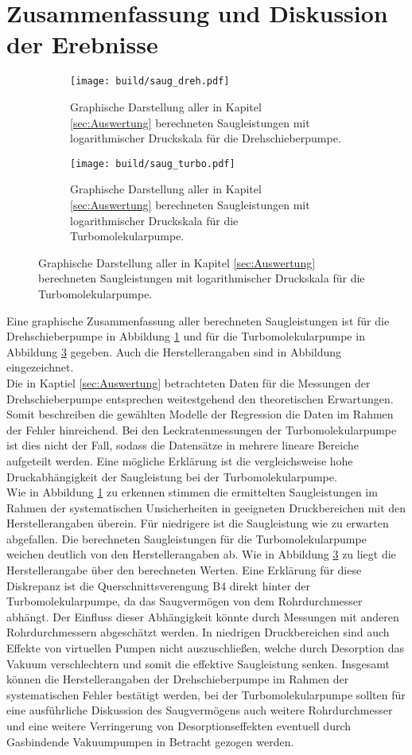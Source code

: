 \section{Zusammenfassung und Diskussion der Erebnisse}
\label{sec:Diskussion}
\begin{figure}[ht]
    \begin{subfigure}{0.8\textwidth}
            \centering
            \texttt{[image: build/saug\_dreh.pdf]}
            \caption{Graphische Darstellung aller in Kapitel \ref{sec:Auswertung} berechneten Saugleistungen mit logarithmischer Druckskala für die Drehschieberpumpe.}
            \label{fig:saug_dreh}
    \end{subfigure}
    \hfill
    \begin{subfigure}{0.8\textwidth}
            \centering
            \texttt{[image: build/saug\_turbo.pdf]}
            \caption{Graphische Darstellung aller in Kapitel \ref{sec:Auswertung} berechneten Saugleistungen mit logarithmischer Druckskala für die Turbomolekularpumpe.}
            \label{fig:saug_turbo}
    \end{subfigure}
\end{figure}
Eine graphische Zusammenfassung aller berechneten Saugleistungen ist für die Drehschieberpumpe in 
Abbildung \ref{fig:saug_dreh} und für die Turbomolekularpumpe in Abbildung \ref{fig:saug_turbo} 
gegeben. Auch die Herstellerangaben sind in Abbildung eingezeichnet.
\\
Die in Kaptiel \ref{sec:Auswertung} betrachteten Daten für die Messungen der Drehschieberpumpe 
entsprechen weitestgehend den theoretischen Erwartungen. Somit beschreiben die gewählten 
Modelle der Regression die Daten im Rahmen der Fehler hinreichend. Bei den Leckratenmessungen
der Turbomolekularpumpe ist dies nicht der Fall, sodass die Datensätze in mehrere lineare
Bereiche aufgeteilt werden. Eine mögliche Erklärung ist die vergleichsweise hohe Druckabhängigkeit 
der Saugleistung bei der Turbomolekularpumpe. 
\\
Wie in Abbildung \ref{fig:saug_dreh} zu erkennen stimmen die ermittelten Saugleistungen im Rahmen 
der systematischen Unsicherheiten in geeigneten Druckbereichen mit den Herstellerangaben überein.
Für niedrigere ist die Saugleistung wie zu erwarten abgefallen. 
Die berechneten Saugleistungen für die Turbomolekularpumpe weichen deutlich von den Herstellerangaben
ab. Wie in Abbildung \ref{fig:saug_turbo} zu liegt die Herstellerangabe über den berechneten Werten.
Eine Erklärung für diese Diskrepanz ist die Querschnittsverengung B4 direkt hinter der Turbomolekularpumpe,
da das Saugvermögen von dem Rohrdurchmesser abhängt. Der Einfluss dieser Abhängigkeit könnte 
durch Messungen mit anderen Rohrdurchmessern abgeschätzt werden. In niedrigen Druckbereichen sind auch 
Effekte von virtuellen Pumpen nicht auszuschließen, welche durch Desorption das Vakuum verschlechtern 
und somit die effektive Saugleistung senken. 
Insgesamt können die Herstellerangaben der Drehschieberpumpe im Rahmen der systematischen Fehler 
bestätigt werden, bei der Turbomolekularpumpe sollten für eine ausführliche Diskussion des 
Saugvermögens auch weitere Rohrdurchmesser und eine weitere Verringerung von Desorptionseffekten 
eventuell durch Gasbindende Vakuumpumpen in Betracht gezogen werden.